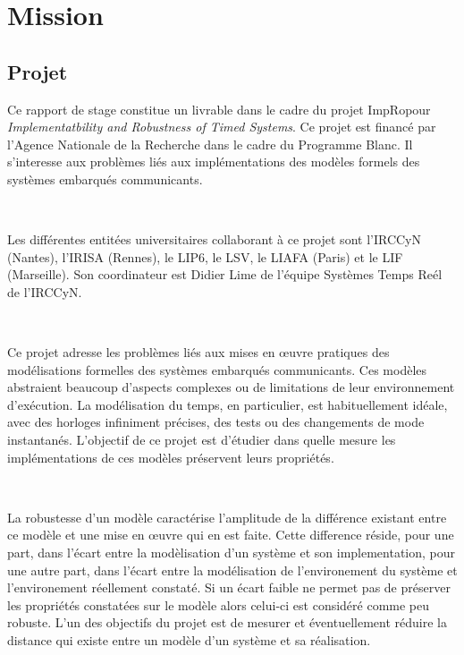 \chapter{Mission}
  \section{Projet}

      Ce rapport de stage constitue un livrable dans le cadre du projet
      ImpRo\footnotemark pour {\it Implementatbility and Robustness of Timed
        Systems}. Ce projet est financé par l'Agence Nationale de la Recherche
      dans le cadre du Programme Blanc. Il s’interesse aux problèmes liés aux
      implémentations des modèles formels des systèmes embarqués communicants.

      ~
    
      Les différentes entitées universitaires collaborant à ce projet sont
      l'IRCCyN (Nantes), l'IRISA (Rennes), le LIP6, le LSV, le LIAFA (Paris) et
      le LIF (Marseille). Son coordinateur est Didier Lime de l'équipe Systèmes
      Temps Reél de l'IRCCyN.

      ~
      
      Ce projet adresse les problèmes liés aux mises en \oe uvre pratiques des
      modélisations formelles des systèmes embarqués communicants. Ces modèles
      abstraient beaucoup d’aspects complexes ou de limitations de leur
      environnement d’exécution. La modélisation du temps, en particulier, est
      habituellement idéale, avec des horloges infiniment précises, des tests ou
      des changements de mode instantanés. L’objectif de ce projet est d’étudier
      dans quelle mesure les implémentations de ces modèles préservent leurs
      propriétés.

      ~
    
      La robustesse d’un modèle caractérise l’amplitude de la différence
      existant entre ce modèle et une mise en \oe uvre qui en est faite. Cette
      difference réside, pour une part, dans l’écart entre la modèlisation d’un
      système et son implementation, pour une autre part, dans l’écart entre la
      modélisation de l’environement du système et l’environement réellement
      constaté. Si un écart faible ne permet pas de préserver les propriétés
      constatées sur le modèle alors celui-ci est considéré comme peu robuste.
      L'un des objectifs du projet est de mesurer et éventuellement réduire la
      distance qui existe entre un modèle d'un système et sa réalisation.

